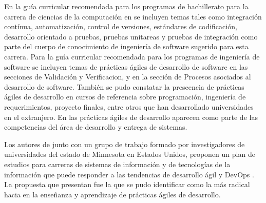 \documentclass[journal]{IEEEtran}
\begin{document}
En la guía curricular recomendada para los programas de bachillerato para la carrera de ciencias de la computación en \cite{acm-cs-curriculum} se incluyen temas tales como integración contínua, automatización, control de versiones, estándares de codificación, desarrollo orientado a pruebas, pruebas unitareas y pruebas de integración como parte del cuerpo de conocimiento de ingeniería de software sugerido para esta carrera. Para la guía curricular recomendada para los programas de ingeniería de software \cite{acm-se-curriculum} se incluyen temas de prácticas ágiles de desarrollo de software en las secciones de Validación y Verificacion, y en la sección de Procesos asociados al desarrollo de software. También se pudo constatar la prescencia de prácticas ágiles de desarrollo en cursos de referencia sobre  programación, ingeniería de requerimientos, proyecto finales, entre otros que han desarrollado universidades en el extranjero. En \cite{acm-msis-curriculum} las prácticas ágiles de desarrollo aparecen como parte de las competencias del área de desarrollo y entrega de sistemas. 

Los autores de \cite{betz-et-al} junto con un grupo de trabajo formado por investigadores de universidades del estado de Minnesota en Estados Unidos, proponen un plan de estudios para carreras de sistemas de información y de tecnologías de la información que puede responder a las tendencias de desarrollo ágil y DevOps \cite{advance-it}. La propuesta que presentan fue la que se pudo identificar como la más radical hacia en la enseñanza y aprendizaje de prácticas ágiles de desarrollo.
\end{document}
